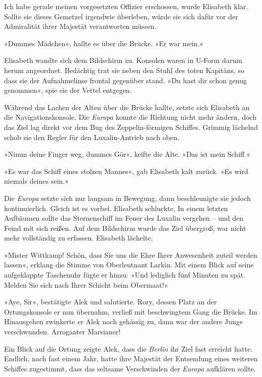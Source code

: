 Ich habe gerade meinen vorgesetzten Offizier erschossen, wurde
Elisabeth klar. Sollte sie dieses Gemetzel irgendwie überleben,
würde sie sich dafür vor der Admiralität ihrer Majestät
verantworten müssen.

\bigpar

»Dummes Mädchen«, hallte es über die Brücke. »Er war mein.«

Elisabeth wandte sich dem Bildschirm zu. Konsolen waren in U-Form
darum herum angeordnet. Bedächtig trat sie neben den Stuhl des
toten Kapitäns, so dass sie der Aufnahmelinse frontal gegenüber
stand. »Du hast dir schon genug genommen«, spie sie der Vettel
entgegen.

Während das Lachen der Alten über die Brücke hallte, setzte sich
Elisabeth an die Navigationskonsole. Die \textit{Europa} konnte die Richtung
nicht mehr ändern, doch das Ziel lag direkt vor dem Bug des
Zeppelin-förmigen Schiffes. Grimmig lächelnd schob sie den Regler
für den Luxalin-Antrieb nach oben.

»Nimm deine Finger weg, dummes Gör«, keifte die Alte. »Das ist mein
Schiff.«

»Es war das Schiff eines stolzen Mannes«, gab Elisabeth kalt
zurück. »Es wird niemals deines sein.«

\bigpar

Die \textit{Europa} setzte sich nur langsam in Bewegung, dann beschleunigte
sie jedoch kontinuierlich. Gleich ist es vorbei. Elisabeth
schluckte. In einem letzten Aufbäumen sollte das Sternenschiff im
Feuer des Luxalin vergehen – und den Feind mit sich reißen. Auf dem
Bildschirm wurde das Ziel übergroß, war nicht mehr vollständig zu
erfassen. Elisabeth lächelte.


»Mister Wittkamp! Schön, dass Sie uns die Ehre Ihrer Anwesenheit
zuteil werden lassen«, erklang die Stimme von Oberleutnant Larkin.
Mit einem Blick auf seine aufgeklappte Taschenuhr fügte er hinzu:
»Und lediglich fünf Minuten zu spät. Melden Sie sich nach Ihrer
Schicht beim Obermaat!«

»Aye, Sir«, bestätigte Alek und salutierte. Rory, dessen Platz an
der Ortungskonsole er nun übernahm, verließ mit beschwingtem Gang
die Brücke. Im Hinausgehen zwinkerte er Alek noch gehässig zu, dann
war der andere Junge verschwunden. Arroganter Marsianer!

Ein Blick auf die Ortung zeigte Alek, dass die \textit{Berlin} ihr Ziel fast
erreicht hatte. Endlich, nach fast einem Jahr, hatte ihre Majestät
der Entsendung eines weiteren Schiffes zugestimmt, dass das
seltsame Verschwinden der \textit{Europa} aufklären sollte.

